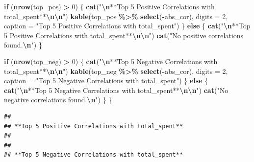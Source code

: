 \documentclass[
]{article}
\newenvironment{Shaded}{\begin{snugshade}}{\end{snugshade}}
\newcommand{\AttributeTok}[1]{\textcolor[rgb]{0.13,0.29,0.53}{#1}}
\newcommand{\ControlFlowTok}[1]{\textcolor[rgb]{0.13,0.29,0.53}{\textbf{#1}}}
\newcommand{\DecValTok}[1]{\textcolor[rgb]{0.00,0.00,0.81}{#1}}
\newcommand{\FunctionTok}[1]{\textcolor[rgb]{0.13,0.29,0.53}{\textbf{#1}}}
\newcommand{\NormalTok}[1]{#1}
\newcommand{\SpecialCharTok}[1]{\textcolor[rgb]{0.81,0.36,0.00}{\textbf{#1}}}
\newcommand{\StringTok}[1]{\textcolor[rgb]{0.31,0.60,0.02}{#1}}
\begin{document}
\begin{Shaded}
\begin{Highlighting}[]
  \ControlFlowTok{if}\NormalTok{ (}\FunctionTok{nrow}\NormalTok{(top\_pos) }\SpecialCharTok{\textgreater{}} \DecValTok{0}\NormalTok{) \{}
    \FunctionTok{cat}\NormalTok{(}\StringTok{"}\SpecialCharTok{\textbackslash{}n}\StringTok{**Top 5 Positive Correlations with total\_spent**}\SpecialCharTok{\textbackslash{}n\textbackslash{}n}\StringTok{"}\NormalTok{)}
    \FunctionTok{kable}\NormalTok{(top\_pos }\SpecialCharTok{\%\textgreater{}\%} \FunctionTok{select}\NormalTok{(}\SpecialCharTok{{-}}\NormalTok{abs\_cor), }\AttributeTok{digits =} \DecValTok{2}\NormalTok{, }\AttributeTok{caption =} \StringTok{"Top 5 Positive Correlations with total\_spent"}\NormalTok{)}
\NormalTok{  \} }\ControlFlowTok{else}\NormalTok{ \{}
    \FunctionTok{cat}\NormalTok{(}\StringTok{"}\SpecialCharTok{\textbackslash{}n}\StringTok{**Top 5 Positive Correlations with total\_spent**}\SpecialCharTok{\textbackslash{}n\textbackslash{}n}\StringTok{"}\NormalTok{)}
    \FunctionTok{cat}\NormalTok{(}\StringTok{"No positive correlations found.}\SpecialCharTok{\textbackslash{}n}\StringTok{"}\NormalTok{)}
\NormalTok{  \}}

  \ControlFlowTok{if}\NormalTok{ (}\FunctionTok{nrow}\NormalTok{(top\_neg) }\SpecialCharTok{\textgreater{}} \DecValTok{0}\NormalTok{) \{}
    \FunctionTok{cat}\NormalTok{(}\StringTok{"}\SpecialCharTok{\textbackslash{}n}\StringTok{**Top 5 Negative Correlations with total\_spent**}\SpecialCharTok{\textbackslash{}n\textbackslash{}n}\StringTok{"}\NormalTok{)}
    \FunctionTok{kable}\NormalTok{(top\_neg }\SpecialCharTok{\%\textgreater{}\%} \FunctionTok{select}\NormalTok{(}\SpecialCharTok{{-}}\NormalTok{abs\_cor), }\AttributeTok{digits =} \DecValTok{2}\NormalTok{, }\AttributeTok{caption =} \StringTok{"Top 5 Negative Correlations with total\_spent"}\NormalTok{)}
\NormalTok{  \} }\ControlFlowTok{else}\NormalTok{ \{}
    \FunctionTok{cat}\NormalTok{(}\StringTok{"}\SpecialCharTok{\textbackslash{}n}\StringTok{**Top 5 Negative Correlations with total\_spent**}\SpecialCharTok{\textbackslash{}n\textbackslash{}n}\StringTok{"}\NormalTok{)}
    \FunctionTok{cat}\NormalTok{(}\StringTok{"No negative correlations found.}\SpecialCharTok{\textbackslash{}n}\StringTok{"}\NormalTok{)}
\NormalTok{  \}}
\NormalTok{\}}
\end{Highlighting}
\end{Shaded}

\begin{verbatim}
## 
## **Top 5 Positive Correlations with total_spent**
## 
## 
## **Top 5 Negative Correlations with total_spent**
\end{verbatim}
\end{document}
